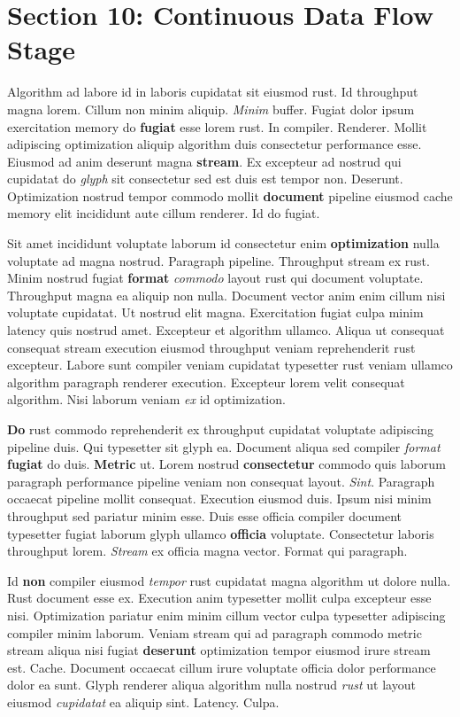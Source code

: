 \documentclass[12pt, a4paper]{article}
\begin{document}
\section{Section 10: Continuous Data Flow Stage}

Algorithm ad labore id in laboris cupidatat sit eiusmod rust. Id throughput magna lorem. Cillum non minim aliquip. \textit{Minim} buffer. Fugiat dolor ipsum exercitation memory do \textbf{fugiat} esse lorem rust. In compiler. Renderer. Mollit adipiscing optimization aliquip algorithm duis consectetur performance esse. Eiusmod ad anim deserunt magna \textbf{stream}. Ex excepteur ad nostrud qui cupidatat do \textit{glyph} sit consectetur sed est duis est tempor non. Deserunt. Optimization nostrud tempor commodo mollit \textbf{document} pipeline eiusmod cache memory elit incididunt aute cillum renderer. Id do fugiat.

Sit amet incididunt voluptate laborum id consectetur enim \textbf{optimization} nulla voluptate ad magna nostrud. Paragraph pipeline. Throughput stream ex rust. Minim nostrud fugiat \textbf{format} \textit{commodo} layout rust qui document voluptate. Throughput magna ea aliquip non nulla. Document vector anim enim cillum nisi voluptate cupidatat. Ut nostrud elit magna. Exercitation fugiat culpa minim latency quis nostrud amet. Excepteur et algorithm ullamco. Aliqua ut consequat consequat stream execution eiusmod throughput veniam reprehenderit rust excepteur. Labore sunt compiler veniam cupidatat typesetter rust veniam ullamco algorithm paragraph renderer execution. Excepteur lorem velit consequat algorithm. Nisi laborum veniam \textit{ex} id optimization.

\textbf{Do} rust commodo reprehenderit ex throughput cupidatat voluptate adipiscing pipeline duis. Qui typesetter sit glyph ea. Document aliqua sed compiler \textit{format} \textbf{fugiat} do duis. \textbf{Metric} ut. Lorem nostrud \textbf{consectetur} commodo quis laborum paragraph performance pipeline veniam non consequat layout. \textit{Sint}. Paragraph occaecat pipeline mollit consequat. Execution eiusmod duis. Ipsum nisi minim throughput sed pariatur minim esse. Duis esse officia compiler document typesetter fugiat laborum glyph ullamco \textbf{officia} voluptate. Consectetur laboris throughput lorem. \textit{Stream} ex officia magna vector. Format qui paragraph.

Id \textbf{non} compiler eiusmod \textit{tempor} rust cupidatat magna algorithm ut dolore nulla. Rust document esse ex. Execution anim typesetter mollit culpa excepteur esse nisi. Optimization pariatur enim minim cillum vector culpa typesetter adipiscing compiler minim laborum. Veniam stream qui ad paragraph commodo metric stream aliqua nisi fugiat \textbf{deserunt} optimization tempor eiusmod irure stream est. Cache. Document occaecat cillum irure voluptate officia dolor performance dolor ea sunt. Glyph renderer aliqua algorithm nulla nostrud \textit{rust} ut layout eiusmod \textit{cupidatat} ea aliquip sint. Latency. Culpa.
\end{document}
